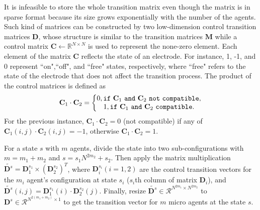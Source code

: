 \documentclass[conference, onecolumn]{IEEEtran}
\begin{document}
It is infeasible to store the whole transition matrix even though the matrix is in sparse format because its size grows exponentially with the number of the agents. Such kind of matrices can be constructed by two low-dimension control transition matrices $\textbf{D}$, whose structure is similar to the transition matrices $\textbf{M}$ while a control matrix $\textbf{C} \gets \mathbb{R}^{N \times N}$ is used to represent the none-zero element. Each element of the matrix $\textbf{C}$ reflects the state of an electrode. For instance, 1, -1, and 0 represent ``on",``off", and ``free" states, respectively, where ``free" refers to the state of the electrode that does not affect the transition process. The product of the control matrices is defined as
\begin{equation}
	{\textbf{C}_1 \cdot \textbf{C}_2 } = \left\{\begin{matrix}
		0, {\tt if \ } \textbf{C}_1 {\tt \ and\ } \textbf{C}_2 {\tt\  not\ compatible}, \\1, {\tt if \ } \textbf{C}_1 {\tt \ and\ } \textbf{C}_2 {\tt\  compatible}.
	\end{matrix}\right.
	\label{controltransitiondot}
\end{equation}
For the previous instance, $\textbf{C}_1 \cdot \textbf{C}_2 = 0$  (not compatible) if any of $\textbf{C}_1(i,j) \cdot \textbf{C}_2(i,j) =-1$, otherwise $\textbf{C}_1 \cdot \textbf{C}_2 = 1$. 


For a state $s$ with $m$ agents, divide the state into two sub-configurations with $m=m_1 + m_2$ and $s = s_1N^{2m_2}+s_2$. Then apply the matrix multiplication $\widetilde{\textbf{D}^s} = \textbf{D}_1^{s_1} \times (\textbf{D}_2^{s_2})^T$, where $\textbf{D}_i^{s_i}(i=1,2)$ are the control transition vectors for the $m_i$ agent's configuration at state $s_i$ ($s_i$th column of matrix $\textbf{D}_i$), and $\widetilde{\textbf{D}^s}(i,j) = \textbf{D}_1^{s_1}(i) \cdot \textbf{D}_2^{s_2}(j)$. Finally, resize $\widetilde{\textbf{D}^s}\in \mathcal{R}^{N^{2m_1} \times N^{2m_2}}$ to $\textbf{D}^s \in \mathcal{R}^{N^{2(m_1+m_2)} \times 1}$ to get the transition vector for $m$ micro agents at the state $s$.
\end{document}

